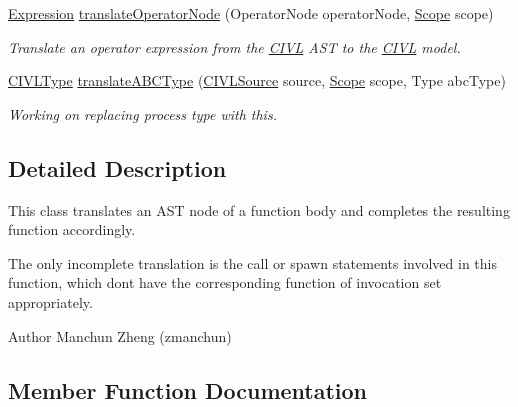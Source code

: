 \begin{DoxyCompactItemize}
\item 
\hyperlink{interfaceedu_1_1udel_1_1cis_1_1vsl_1_1civl_1_1model_1_1IF_1_1expression_1_1Expression}{Expression} \hyperlink{classedu_1_1udel_1_1cis_1_1vsl_1_1civl_1_1model_1_1common_1_1FunctionTranslator_a2f3f4e258998de9c0f2b58ef7265e041}{translate\+Operator\+Node} (Operator\+Node operator\+Node, \hyperlink{interfaceedu_1_1udel_1_1cis_1_1vsl_1_1civl_1_1model_1_1IF_1_1Scope}{Scope} scope)
\begin{DoxyCompactList}\small\item\em Translate an operator expression from the \hyperlink{classedu_1_1udel_1_1cis_1_1vsl_1_1civl_1_1CIVL}{C\+I\+V\+L} A\+S\+T to the \hyperlink{classedu_1_1udel_1_1cis_1_1vsl_1_1civl_1_1CIVL}{C\+I\+V\+L} model. \end{DoxyCompactList}\item 
\hyperlink{interfaceedu_1_1udel_1_1cis_1_1vsl_1_1civl_1_1model_1_1IF_1_1type_1_1CIVLType}{C\+I\+V\+L\+Type} \hyperlink{classedu_1_1udel_1_1cis_1_1vsl_1_1civl_1_1model_1_1common_1_1FunctionTranslator_aa3881d82c716b1e1cdaad4ee55f0115d}{translate\+A\+B\+C\+Type} (\hyperlink{interfaceedu_1_1udel_1_1cis_1_1vsl_1_1civl_1_1model_1_1IF_1_1CIVLSource}{C\+I\+V\+L\+Source} source, \hyperlink{interfaceedu_1_1udel_1_1cis_1_1vsl_1_1civl_1_1model_1_1IF_1_1Scope}{Scope} scope, Type abc\+Type)
\begin{DoxyCompactList}\small\item\em Working on replacing process type with this. \end{DoxyCompactList}\end{DoxyCompactItemize}


\subsection{Detailed Description}
This class translates an A\+S\+T node of a function body and completes the resulting function accordingly. 

The only incomplete translation is the call or spawn statements involved in this function, which dont have the corresponding function of invocation set appropriately.

\begin{DoxyAuthor}{Author}
Manchun Zheng (zmanchun) 
\end{DoxyAuthor}


\subsection{Member Function Documentation}
\hypertarget{classedu_1_1udel_1_1cis_1_1vsl_1_1civl_1_1model_1_1common_1_1FunctionTranslator_a31010823e5438cc39a303b53320bf09f}{}
